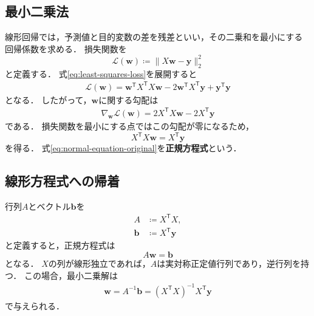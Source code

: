 \subsection{最小二乗法}
\label{subsec:least-squares-method}

線形回帰では，予測値と目的変数の差を残差といい，その二乗和を最小にする回帰係数を求める．
損失関数を
\begin{equation}
  \mathcal{L}(\bm{w})
  \coloneq
  \|X\bm{w}-\bm{y}\|_2^2
  \label{eq:least-squares-loss}
\end{equation}
と定義する．
式\eqref{eq:least-squares-loss}を展開すると
\begin{align*}
  \mathcal{L}(\bm{w})
  =
  \bm{w}^{\mathsf{T}}X^{\mathsf{T}}X\bm{w}
  -2\bm{w}^{\mathsf{T}}X^{\mathsf{T}}\bm{y}
  +\bm{y}^{\mathsf{T}}\bm{y}
\end{align*}
となる．
したがって，$\bm{w}$に関する勾配は
\begin{align*}
  \nabla_{\bm{w}}\mathcal{L}(\bm{w})
  =
  2X^{\mathsf{T}}X\bm{w}-2X^{\mathsf{T}}\bm{y}
\end{align*}
である．
損失関数を最小にする点ではこの勾配が零になるため，
\begin{equation}
  X^{\mathsf{T}}X\bm{w}
  =
  X^{\mathsf{T}}\bm{y}
  \label{eq:normal-equation-original}
\end{equation}
を得る．
式\eqref{eq:normal-equation-original}を\textbf{正規方程式}という．

\subsection{線形方程式への帰着}
\label{subsec:reduction-to-linear-system}

行列$A$とベクトル$\bm{b}$を
\begin{align}
  A
  &\coloneq
  X^{\mathsf{T}}X,
  \label{eq:regression-matrix-a}\\
  \bm{b}
  &\coloneq
  X^{\mathsf{T}}\bm{y}
  \label{eq:regression-vector-b}
\end{align}
と定義すると，正規方程式は
\begin{equation}
  A\bm{w}=\bm{b}
  \label{eq:regression-linear-system}
\end{equation}
となる．
$X$の列が線形独立であれば，$A$は実対称正定値行列であり，逆行列を持つ．
この場合，最小二乗解は
\begin{align*}
  \bm{w}
  =
  A^{-1}\bm{b}
  =
  (X^{\mathsf{T}}X)^{-1}X^{\mathsf{T}}\bm{y}
\end{align*}
で与えられる．


